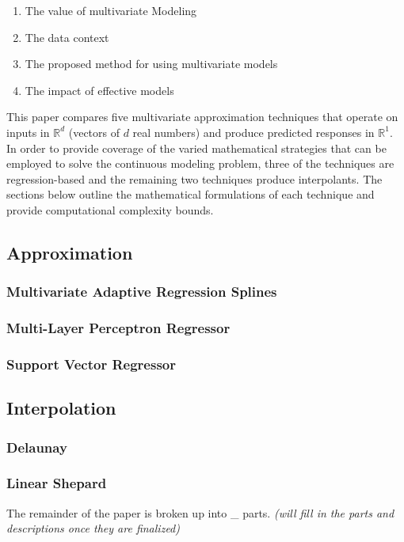 \documentclass{scspaperproc}
\theoremstyle{scsthe}
\begin{document}
\begin{enumerate}
\item The value of multivariate Modeling
\item The data context
\item The proposed method for using multivariate models
\item The impact of effective models
\end{enumerate}

This paper compares five multivariate approximation techniques that
operate on inputs in $\mathbb{R}^d$ (vectors of $d$ real numbers) and
produce predicted responses in $\mathbb{R}^1$. In order to provide
coverage of the varied mathematical strategies that can be employed to
solve the continuous modeling problem, three of the techniques are
regression-based and the remaining two techniques produce
interpolants. The sections below outline the mathematical formulations
of each technique and provide computational complexity bounds.

\subsection{Approximation}
\subsubsection{Multivariate Adaptive Regression Splines}
\subsubsection{Multi-Layer Perceptron Regressor}
\subsubsection{Support Vector Regressor}

\subsection{Interpolation}
\subsubsection{Delaunay}
\subsubsection{Linear Shepard}

The remainder of the paper is broken up into \_ parts. \textit{(will
  fill in the parts and descriptions once they are finalized)}
\end{document}
